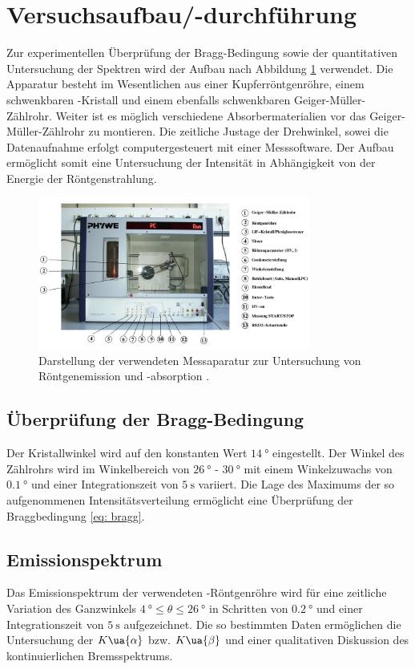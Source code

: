 \section{Versuchsaufbau/-durchführung}
Zur experimentellen Überprüfung der Bragg-Bedingung sowie der quantitativen Untersuchung der Spektren wird der Aufbau nach Abbildung
\ref{fig: aufbau} verwendet. Die Apparatur besteht im Wesentlichen aus einer Kupferröntgenröhre, einem schwenkbaren -Kristall
und einem ebenfalls schwenkbaren Geiger-Müller-Zählrohr. Weiter ist es möglich verschiedene Absorbermaterialien vor das Geiger-Müller-Zählrohr
zu montieren. Die zeitliche Justage der Drehwinkel, sowei die Datenaufnahme erfolgt computergesteuert mit einer
Messsoftware. Der Aufbau ermöglicht somit eine Untersuchung der Intensität in Abhängigkeit von der Energie
der Röntgenstrahlung.
\begin{figure}
  \centering
  \includegraphics[width = 0.8\textwidth]{pics/aufbau.png}
  \caption{Darstellung der verwendeten Messaparatur zur Untersuchung von Röntgenemission und -absorption \cite{anleitung602}.}
  \label{fig: aufbau}
\end{figure}
\subsection{Überprüfung der Bragg-Bedingung}
Der Kristallwinkel wird auf den konstanten Wert $\SI{14}{\degree}$ eingestellt. Der Winkel des Zählrohrs wird im Winkelbereich
von $\SI{26}{\degree}$ - $\SI{30}{\degree}$ mit einem Winkelzuwachs von $\SI{0.1}{\degree}$ und einer Integrationszeit
von $\SI{5}{\second}$ variiert. Die Lage des Maximums der so aufgenommenen Intensitätsverteilung ermöglicht eine Überprüfung
der Braggbedingung \ref{eq: bragg}.

\subsection{Emissionspektrum}
Das Emissionspektrum der verwendeten -Röntgenröhre wird für eine zeitliche Variation des Ganzwinkels
$\SI{4}{\degree} \leq \theta \leq \SI{26}{\degree}$ in Schritten von $\SI{0.2}{\degree}$ und einer Integrationszeit
von $\SI{5}{\second}$ aufgezeichnet. Die so bestimmten Daten ermöglichen die Untersuchung der $K\ua{\alpha}$ bzw.
$K\ua{\beta}$ und einer qualitativen Diskussion des kontinuierlichen Bremsspektrums.

